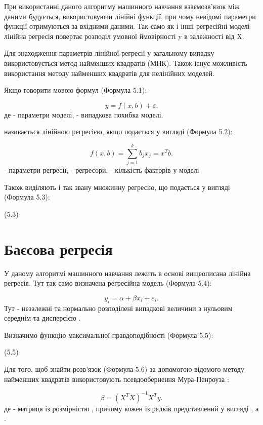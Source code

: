 При використанні даного алгоритму машинного навчання взаємозв'язок між даними будується, використовуючи лінійні функції, при чому невідомі параметри функції отримуються за вхідними даними. Так само як і інші регресійні моделі лінійна регресія повертає розподіл умовної ймовірності y в залежності від X.

Для знаходження параметрів лінійної регресії у загальному випадку використовується метод найменших квадратів (МНК). Також існує можливість використання методу найменших квадратів для нелінійних моделей.

Якщо говорити мовою формул (Формула 5.1):

\begin{equation}\label{eq:linear}y=f(x,b)+\varepsilon.\end{equation}
де - параметри моделі, - випадкова похибка моделі.

називається лінійною регресією, якщо подається у вигляді (Формула 5.2):

\begin{equation}\label{eq:linear-model}f(x,b)=\sum_{j=1}^{k}b_jx_j=x^Tb.\end{equation}
- параметри регресії, - регресори, - кількість факторів у моделі

Також виділяють і так звану множинну регресію, що подається у вигляді (Формула 5.3):

(5.3)

\section{Баєсова регресія}
У даному алгоритмі \cite{ref7} машинного навчання лежить в основі вищеописана лінійна регресія. Тут так само визначена регресійна модель (Формула 5.4):

\begin{equation}\label{eq:bayes}y_i=\alpha+\beta x_i+\varepsilon_i.\end{equation}
Тут - незалежні та нормально розподілені випадкові величини з нульовим середнім та дисперсією .

Визначимо функцію максимальної правдоподібності (Формула 5.5):

(5.5)

Для того, щоб знайти розв’язок (Формула 5.6) за допомогою відомого методу найменших квадратів використовують псевдообернення Мура-Пенроуза :

\begin{equation}\label{eq:least-squares}\beta=(X^TX)^{-1}X^Ty.\end{equation}
де - матриця із розмірністю , причому кожен із рядків представлений у вигляді , а .

